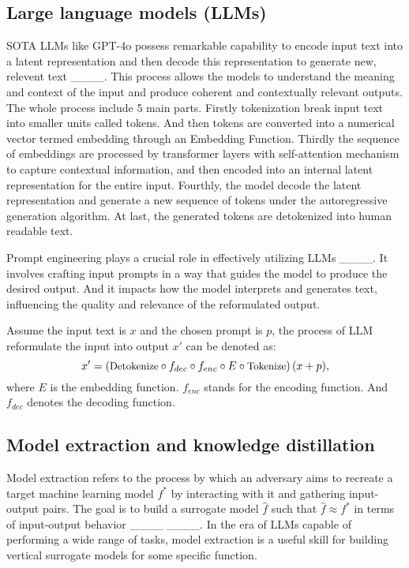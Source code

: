 \subsection{Large language models (LLMs) }SOTA LLMs like GPT-4o possess remarkable capability to encode input text into a latent representation and then decode this representation to generate new, relevent text ____. This process allows the models to understand the meaning and context of the input and produce coherent and contextually relevant outputs.
The whole process include 5 main parts. Firstly tokenization break input text into smaller units called tokens. And then tokens are converted into a numerical vector termed embedding through an Embedding Function. Thirdly the sequence of embeddings are processed by transformer layers with self-attention mechanism to capture contextual information, and then  encoded into an internal latent representation for the entire input. Fourthly, the model decode the latent representation and generate a new sequence of tokens under the autoregressive generation algorithm. At last, the generated tokens are detokenized into human readable text.

Prompt engineering plays a crucial role in effectively utilizing LLMs ____. It involves crafting input prompts in a way that guides the model to produce the desired output. And it impacts how the model interprets and generates text, influencing the quality and relevance of the reformulated output.

Assume the input text is $x$ and the chosen prompt is $p$, the process of LLM reformulate the input into output $x'$ can be denoted as:
\begin{equation}
\small
x' = \left( \text{Detokenize} \circ f_{dec} \circ f_{enc} \circ E \circ \text{Tokenize} \right)(x+p),
\end{equation}
where $E$ is the embedding function.  $f_{enc}$ stands for the encoding function. And $f_{dec}$ denotes the decoding function.
\subsection{Model extraction and knowledge distillation}
Model extraction refers to the process by which an adversary aims to recreate a target machine learning model $f^*$ by interacting with it and gathering input-output pairs. The goal is to build a surrogate model $\hat{f}$ such that $\hat{f}\approx f^*$ in terms of input-output behavior ____ ____. In the era of LLMs capable of performing a wide range of tasks, model extraction is a useful skill for building vertical surrogate models for some specific function.

